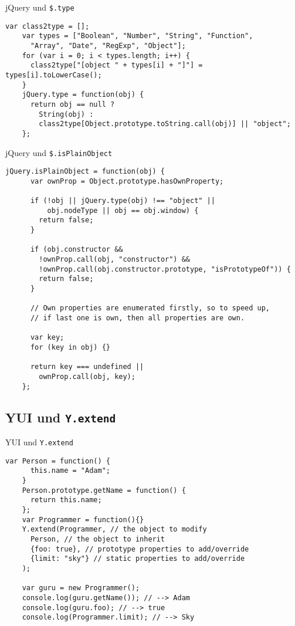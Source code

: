 \begin{frame}[fragile]{jQuery und \texttt{\$.type}}
  \begin{lstlisting}[gobble=4]
    var class2type = [];
    var types = ["Boolean", "Number", "String", "Function",
      "Array", "Date", "RegExp", "Object"];
    for (var i = 0; i < types.length; i++) {
      class2type["[object " + types[i] + "]"] = types[i].toLowerCase();
    }
    jQuery.type = function(obj) {
      return obj == null ?
        String(obj) :
        class2type[Object.prototype.toString.call(obj)] || "object";
    };
  \end{lstlisting}
\end{frame}

\begin{frame}[fragile]{jQuery und \texttt{\$.isPlainObject}}
  \begin{lstlisting}[gobble=4]
    jQuery.isPlainObject = function(obj) {
      var ownProp = Object.prototype.hasOwnProperty;
    
      if (!obj || jQuery.type(obj) !== "object" ||
          obj.nodeType || obj == obj.window) {
        return false;
      }
    
      if (obj.constructor &&
        !ownProp.call(obj, "constructor") &&
        !ownProp.call(obj.constructor.prototype, "isPrototypeOf")) {
        return false;
      }
    
      // Own properties are enumerated firstly, so to speed up,
      // if last one is own, then all properties are own.
    
      var key;
      for (key in obj) {}
    
      return key === undefined ||
        ownProp.call(obj, key);
    };
  \end{lstlisting}
\end{frame}

\subsection{YUI und \texttt{Y.extend}}

\begin{frame}[fragile]{YUI und \texttt{Y.extend}}
  \begin{lstlisting}[gobble=4]
    var Person = function() {
      this.name = "Adam";
    }
    Person.prototype.getName = function() {
      return this.name;
    };
    var Programmer = function(){}
    Y.extend(Programmer, // the object to modify
      Person, // the object to inherit
      {foo: true}, // prototype properties to add/override
      {limit: "sky"} // static properties to add/override
    );
    
    var guru = new Programmer();
    console.log(guru.getName()); // --> Adam
    console.log(guru.foo); // --> true
    console.log(Programmer.limit); // --> Sky
  \end{lstlisting}
\end{frame}

